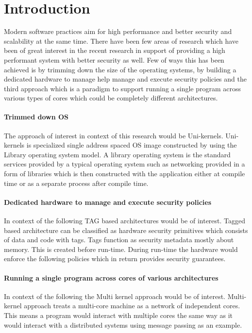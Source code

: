 
\chapter{Introduction}  %
Modern software practices aim for high performance and better security
and scalability at the same time. There have been few areas of research 
which have been of great interest in the recent research in support 
of providing a high performant system with better security as well.
Few of ways this has been achieved is by trimming down the size of 
the operating systems, by building a dedicated hardware to manage 
help manage and execute security policies and the third approach 
which is a paradigm to support running a single program across 
various types of cores which could be completely different 
architectures.

\subsubsection{Trimmed down OS}
The approach of interest in context of this research would 
be Uni-kernels. Uni-kernels is specialized single address 
spaced OS image constructed by using the Library operating 
system model. A library operating system is the standard services 
provided by a typical operating system such as networking provided 
in a form of libraries which is then constructed with the application 
either at compile time or as a separate process after compile time.

\subsubsection{Dedicated hardware to manage and execute security
policies}
In context of the following TAG based architectures would be 
of interest. Tagged based architecture can be classified as 
hardware security primitives which consists of data and code with tags. 
Tags function as security metadata mostly about memory. This is
created before run-time. During run-time the hardware 
would enforce the following policies which in return 
provides security guarantees. 

\subsubsection{Running a single program across cores of 
various architectures}
In context of the following the Multi kernel approach would 
be of interest. Multi-kernel approach treats a multi-core machine 
as a network of independent cores. This means a program would interact
with multiple cores the same way as it would interact with a distributed systems 
using message passing as an example. 

